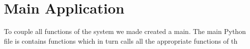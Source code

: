 \section{Main Application} \label{sec:main-app}
To couple all functions of the system we made created a main. The main Python file is contains functions which in turn calls all the appropriate functions of th